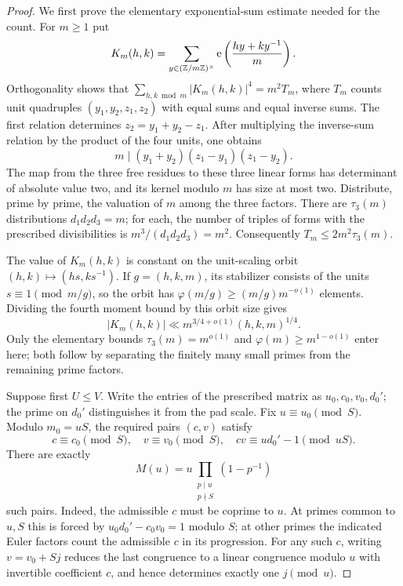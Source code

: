 \begin{proof}
We first prove the elementary exponential-sum estimate needed for
the count.  For $m\geq1$ put
\[
 K_m(h,k)=\sum_{y\in(\mathbb Z/m\mathbb Z)^\times}
                   \mathrm{e}\left(\frac{hy+ky^{-1}}m\right).
\]
Orthogonality shows that
$\sum_{h,k\bmod m}|K_m(h,k)|^4=m^2T_m$, where $T_m$ counts
unit quadruples $(y_1,y_2,z_1,z_2)$ with equal sums and equal
inverse sums.  The first relation determines
$z_2=y_1+y_2-z_1$.  After multiplying the inverse-sum relation
by the product of the four units, one obtains
\[
 m\mid(y_1+y_2)(z_1-y_1)(z_1-y_2).
\]
The map from the three free residues to these three linear forms
has determinant of absolute value two, and its kernel modulo
$m$ has size at most two.  Distribute, prime by prime, the
valuation of $m$ among the three factors.  There are
$\tau_3(m)$ distributions $d_1d_2d_3=m$; for each, the number
of triples of forms with the prescribed divisibilities is
$m^3/(d_1d_2d_3)=m^2$.  Consequently
$T_m\leq2m^2\tau_3(m)$.

The value of $K_m(h,k)$ is constant on the unit-scaling orbit
$(h,k)\mapsto(hs,ks^{-1})$.  If $g=(h,k,m)$, its stabilizer
consists of the units $s\equiv1\pmod{m/g}$, so the orbit has
$\varphi(m/g)\geq(m/g)m^{-o(1)}$ elements.  Dividing the fourth
moment bound by this orbit size gives
\begin{equation}\label{det:weak-kloosterman}
 |K_m(h,k)|\ll m^{3/4+o(1)}(h,k,m)^{1/4}.
\end{equation}
Only the elementary bounds $\tau_3(m)=m^{o(1)}$ and
$\varphi(m)\geq m^{1-o(1)}$ enter here; both follow by separating
the finitely many small primes from the remaining prime factors.

Suppose first $U\leq V$.  Write the entries of the prescribed
matrix as $u_0,c_0,v_0,d_0'$; the prime on $d_0'$ distinguishes
it from the pad scale.  Fix $u\equiv u_0\pmod S$.  Modulo
$m_0=uS$, the required pairs $(c,v)$ satisfy
\begin{equation}\label{det:fixed-u-congruences}
 c\equiv c_0\pmod S,\quad v\equiv v_0\pmod S,
 \quad cv\equiv ud_0'-1\pmod{uS}.
\end{equation}
There are exactly
\begin{equation}\label{det:fixed-u-mass}
 M(u)=u\prod_{\substack{p\mid u\\p\nmid S}}(1-p^{-1})
\end{equation}
such pairs.  Indeed, the admissible $c$ must be coprime to $u$.
At primes common to $u,S$ this is forced by
$u_0d_0'-c_0v_0=1$ modulo $S$; at other primes the indicated
Euler factors count the admissible $c$ in its progression.
For any such $c$, writing $v=v_0+Sj$ reduces the last congruence
to a linear congruence modulo $u$ with invertible coefficient
$c$, and hence determines exactly one $j\pmod u$.


\end{proof}
